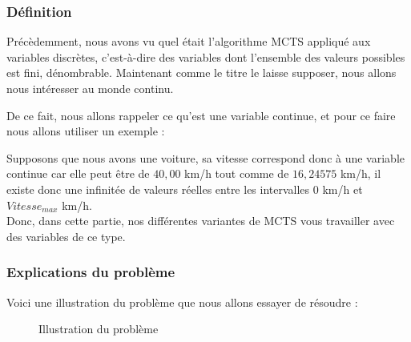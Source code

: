 \documentclass[pdftex,french, english]{article}	%
\begin{document}
	\subsubsection{Définition}

	Précèdemment, nous avons vu quel était l'algorithme MCTS appliqué aux variables discrètes, c'est-à-dire des variables dont l'ensemble des valeurs possibles est fini, dénombrable.
	Maintenant comme le titre le laisse supposer, nous allons nous intéresser au monde continu.

	De ce fait, nous allons rappeler ce qu'est une variable continue, et pour ce faire nous allons utiliser un exemple : 

	Supposons que nous avons une voiture, sa vitesse correspond donc à une variable continue car elle peut être de $40,00$ km/h tout comme de $16,24575$ km/h, il existe donc une infinitée de valeurs réelles entre les intervalles $0$ km/h et $Vitesse_{max}$ km/h. \\

	Donc, dans cette partie, nos différentes variantes de MCTS vous travailler avec des variables de ce type.

	\subsubsection{Explications du problème}

	Voici une illustration du problème \cite{couetoux01} que nous allons essayer de résoudre : \\

	\begin{figure}[h]
	\centering
		\caption{Illustration du problème} \label{fig:probleme}
	\end{figure}
\end{document}
